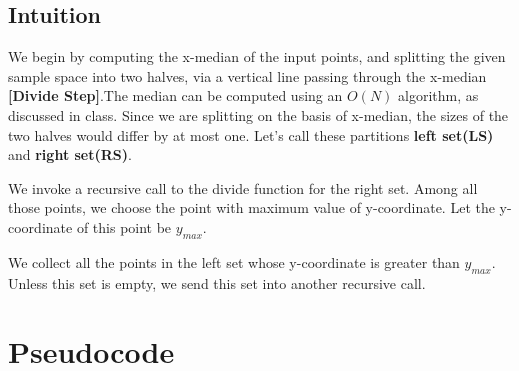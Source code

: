 \documentclass{article}
\begin{document}
\subsection{Intuition}
We begin by computing the x-median of the input points, and splitting the given sample space into two halves, via a vertical line passing through the x-median\textbf{ [Divide Step]}.The median can be computed using an $O(N)$ algorithm, as discussed in class. Since we are splitting on the basis of x-median, the sizes of the two halves would differ by at most one. Let's call these partitions \textbf{left set(LS)} and \textbf{right set(RS)}.

We invoke a recursive call to the divide function for the right set. Among all those points, we choose the point with maximum value of y-coordinate. Let the y-coordinate of this point be $y_{max}$.
\par
We collect all the points in the left set whose y-coordinate is greater than $y_{max}$. Unless this set is empty, we send this set into another recursive call.









\newpage
\section{Pseudocode}


\end{document}
